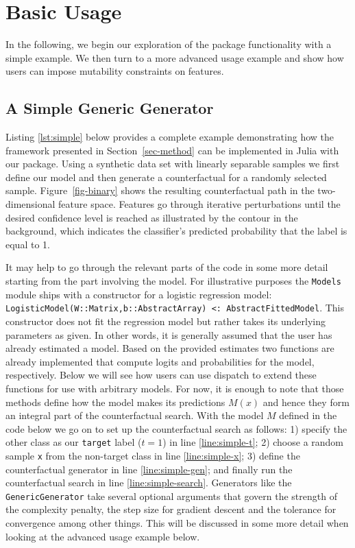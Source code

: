 \documentclass{juliacon}
\begin{document}
\hypertarget{sec-use}{%
\section{Basic Usage}\label{sec-use}}

In the following, we begin our exploration of the package functionality
with a simple example. We then turn to a more advanced usage example and
show how users can impose mutability constraints on features.

\hypertarget{a-simple-generic-generator}{%
\subsection{A Simple Generic
Generator}\label{a-simple-generic-generator}}

Listing \ref{lst:simple} below provides a complete example demonstrating
how the framework presented in Section~\ref{sec-method} can be
implemented in Julia with our package. Using a synthetic data set with
linearly separable samples we first define our model and then generate a
counterfactual for a randomly selected sample. Figure~\ref{fig-binary}
shows the resulting counterfactual path in the two-dimensional feature
space. Features go through iterative perturbations until the desired
confidence level is reached as illustrated by the contour in the
background, which indicates the classifier's predicted probability that
the label is equal to 1.

It may help to go through the relevant parts of the code in some more
detail starting from the part involving the model. For illustrative
purposes the \texttt{Models} module ships with a constructor for a
logistic regression model:
\texttt{LogisticModel(W::Matrix,b::AbstractArray)\ \textless{}:\ AbstractFittedModel}.
This constructor does not fit the regression model but rather takes its
underlying parameters as given. In other words, it is generally assumed
that the user has already estimated a model. Based on the provided
estimates two functions are already implemented that compute logits and
probabilities for the model, respectively. Below we will see how users
can use dispatch to extend these functions for use with arbitrary
models. For now, it is enough to note that those methods define how the
model makes its predictions \(M(x)\) and hence they form an integral
part of the counterfactual search. With the model \(M\) defined in the
code below we go on to set up the counterfactual search as follows: 1)
specify the other class as our \texttt{target} label (\(t=1\)) in line
\ref{line:simple-t}; 2) choose a random sample \texttt{x} from the
non-target class in line \ref{line:simple-x}; 3) define the
counterfactual generator in line \ref{line:simple-gen}; and finally run
the counterfactual search in line \ref{line:simple-search}. Generators
like the \texttt{GenericGenerator} take several optional arguments that
govern the strength of the complexity penalty, the step size for
gradient descent and the tolerance for convergence among other things.
This will be discussed in some more detail when looking at the advanced
usage example below.
\end{document}
